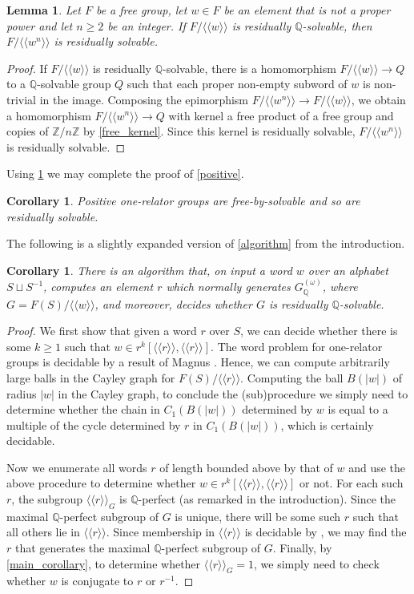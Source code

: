 \documentclass{amsart}
\newtheorem{lemma}[theorem]{Lemma}
\newtheorem{corollary}[theorem]{Corollary}
\theoremstyle{definition}
\newcommand{\Z}{\mathbb{Z}}
\newcommand{\Q}{\mathbb{Q}}
\newcommand{\normal}[1]{\langle\!\langle #1 \rangle\!\rangle}
\begin{document}
\begin{lemma}
\label{resid_solvable_torsion}
Let $F$ be a free group, let $w\in F$ be an element that is not a proper power and let $n\geqslant 2$ be an integer. If $F/\normal{w}$ is residually $\Q$-solvable, then $F/\normal{w^n}$ is residually solvable.
\end{lemma}

\begin{proof}
If $F/\normal{w}$ is residually $\Q$-solvable, there is a homomorphism $F/\normal{w}\to Q$ to a $\Q$-solvable group $Q$ such that each proper non-empty subword of $w$ is non-trivial in the image. Composing the epimorphism $F/\normal{w^n}\to F/\normal{w}$, we obtain a homomorphism $F/\normal{w^n}\to Q$ with kernel a free product of a free group and copies of $\Z/n\Z$ by \cref{free_kernel}. Since this kernel is residually solvable, $F/\normal{w^n}$ is residually solvable.
\end{proof}

Using \cref{resid_solvable_torsion} we may complete the proof of \cref{positive}.

\begin{corollary}
Positive one-relator groups are free-by-solvable and so are residually solvable.
\end{corollary}

The following is a slightly expanded version of \cref{algorithm} from the introduction.

\begin{corollary}
There is an algorithm that, on input a word $w$ over an alphabet $S\sqcup S^{-1}$, computes an element $r$ which normally generates $G_{\Q}^{(\omega)}$, where $G = F(S)/\normal{w}$, and moreover, decides whether $G$ is residually $\Q$-solvable.
\end{corollary}

\begin{proof}
We first show that given a word $r$ over $S$, we can decide whether there is some $k\geqslant 1$ such that $w\in r^k[\normal{r}, \normal{r}]$. The word problem for one-relator groups is decidable by a result of Magnus \cite{Ma32}. Hence, we can compute arbitrarily large balls in the Cayley graph for $F(S)/\normal{r}$. Computing the ball $B(|w|)$ of radius $|w|$ in the Cayley graph, to conclude the (sub)procedure we simply need to determine whether the chain in $C_1(B(|w|))$ determined by $w$ is equal to a multiple of the cycle determined by $r$ in $C_1(B(|w|))$, which is certainly decidable.

Now we enumerate all words $r$ of length bounded above by that of $w$ and use the above procedure to determine whether $w\in r^k[\normal{r}, \normal{r}]$ or not. For each such $r$, the subgroup $\normal{r}_G$ is $\Q$-perfect (as remarked in the introduction). Since the maximal $\Q$-perfect subgroup of $G$ is unique, there will be some such $r$ such that all others lie in $\normal{r}$. Since membership in $\normal{r}$ is decidable by \cite{Ma32}, we may find the $r$ that generates the maximal $\Q$-perfect subgroup of $G$. Finally, by \cref{main_corollary}, to determine whether $\normal{r}_G = 1$, we simply need to check whether $w$ is conjugate to $r$ or $r^{-1}$.
\end{proof}
\end{document}
